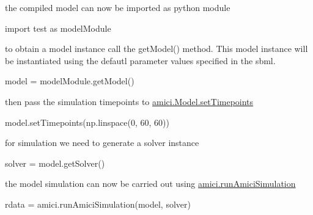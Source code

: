 the compiled model can now be imported as python module \begin{DoxyVerb}import test as modelModule
\end{DoxyVerb}


to obtain a model instance call the {\ttfamily get\+Model()} method. This model instance will be instantiated using the defautl parameter values specified in the sbml. \begin{DoxyVerb}model = modelModule.getModel()
\end{DoxyVerb}


then pass the simulation timepoints to {\ttfamily \mbox{\hyperlink{classamici_1_1_model_a50f9642f9bcb883dbd3925c85abc4c24}{amici.\+Model.\+set\+Timepoints}}} \begin{DoxyVerb}model.setTimepoints(np.linspace(0, 60, 60)) 
\end{DoxyVerb}


for simulation we need to generate a solver instance \begin{DoxyVerb}solver = model.getSolver()
\end{DoxyVerb}


the model simulation can now be carried out using {\ttfamily \mbox{\hyperlink{namespaceamici_a46331a204e7511587acc2cc0b1ce7ed0}{amici.\+run\+Amici\+Simulation}}} \begin{DoxyVerb}rdata = amici.runAmiciSimulation(model, solver)\end{DoxyVerb}
 